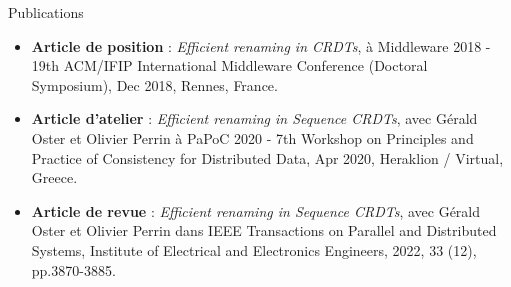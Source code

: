 \begin{frame}{Publications}
    \begin{itemize}
        \item \textbf{Article de position} : \emph{Efficient renaming in CRDTs}, à Middleware 2018 - 19th ACM/IFIP International Middleware Conference (Doctoral Symposium), Dec 2018, Rennes, France.
        \item \textbf{Article d'atelier} : \emph{Efficient renaming in Sequence CRDTs}, avec Gérald Oster et Olivier Perrin à PaPoC 2020 - 7th Workshop on Principles and Practice of Consistency for Distributed Data, Apr 2020, Heraklion / Virtual, Greece.
        \item \textbf{Article de revue} : \emph{Efficient renaming in Sequence CRDTs}, avec Gérald Oster et Olivier Perrin dans IEEE Transactions on Parallel and Distributed Systems, Institute of Electrical and Electronics Engineers, 2022, 33 (12), pp.3870-3885.
    \end{itemize}
\end{frame}
